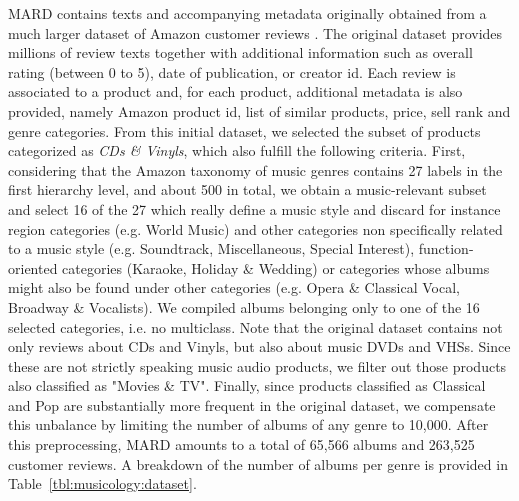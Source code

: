MARD contains texts and accompanying metadata originally obtained from a much larger dataset of Amazon customer reviews \cite{McAuley2015a,McAuley2015}. The original dataset provides millions of review texts together with additional information such as overall rating (between 0 to 5), date of publication, or creator id. Each review is associated to a product and, for each product, additional metadata is also provided, namely Amazon product id, list of similar products, price, sell rank and genre categories. From this initial dataset, we selected the subset of products categorized as \textit{CDs \& Vinyls}, which also fulfill the following criteria. First, considering that the Amazon taxonomy of music genres contains 27 labels in the first hierarchy level, and about 500 in total, we obtain a music-relevant subset and select 16 of the 27 which really define a music style and discard for instance region categories (e.g. World Music) and other categories non specifically related to a music style (e.g. Soundtrack, Miscellaneous, Special Interest), function-oriented categories (Karaoke, Holiday \& Wedding) or categories whose albums might also be found under other categories (e.g. Opera \& Classical Vocal, Broadway \& Vocalists). We compiled albums belonging only to one of the 16 selected categories, i.e. no multiclass. Note that the original dataset contains not only reviews about CDs and Vinyls, but also about music DVDs and VHSs. Since these are not strictly speaking music audio products, we filter out those products also classified as "Movies \& TV". Finally, since products classified as Classical and Pop are substantially more frequent in the original dataset, we compensate this unbalance by limiting the number of albums of any genre to 10,000. After this preprocessing, MARD amounts to a total of 65,566 albums and 263,525 customer reviews. A breakdown of the number of albums per genre is provided in Table~\ref{tbl:musicology:dataset}.

